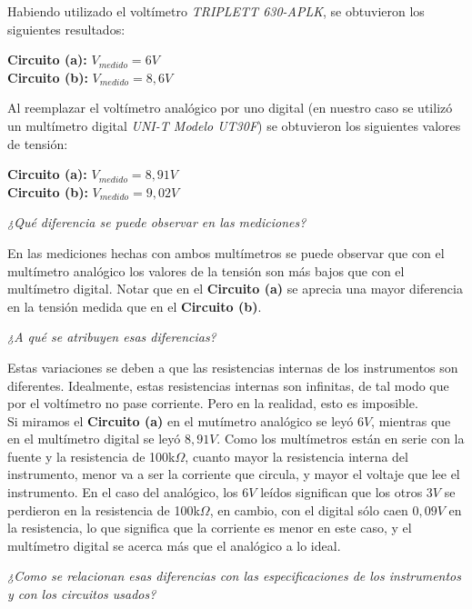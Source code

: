 \documentclass{article}
\begin{document}
\noindent Habiendo utilizado el voltímetro \textit{TRIPLETT 630-APLK}, se obtuvieron los siguientes resultados:
\bigskip

	\indent \textbf{Circuito (a):} $V_{medido} = 6V$ \smallskip\\
	\indent \textbf{Circuito (b):} $V_{medido} = 8,6V$ \\
	\medskip

	Al reemplazar el voltímetro analógico por uno digital (en nuestro caso se utilizó un multímetro digital \textit{UNI-T Modelo UT30F}) se obtuvieron los siguientes valores de tensión:
\bigskip

	\indent \textbf{Circuito (a):} $V_{medido} = 8,91V$ \smallskip\\
	\indent \textbf{Circuito (b):} $V_{medido} = 9,02V$ \\
	\bigskip



\newpage
\textit{¿Qué diferencia se puede observar en las mediciones?}
\medskip

	En las mediciones hechas con ambos multímetros se puede observar que con el multímetro analógico los valores de la tensión son más bajos que con el multímetro digital. Notar que en el \textbf{Circuito (a)} se aprecia una mayor diferencia en la tensión medida que en el 
 \textbf{Circuito (b)}.
\bigskip\bigskip


\textit{¿A qué se atribuyen esas diferencias?}
\medskip
	
	Estas variaciones se deben a que las resistencias internas de los instrumentos son diferentes. Idealmente, estas resistencias internas son infinitas, de tal modo que por el voltímetro no pase corriente. Pero en la realidad, esto es imposible.\\
\indent Si miramos el \textbf{Circuito (a)} en el mutímetro analógico se leyó $6V$, mientras que en el multímetro digital se leyó $8,91V$. Como los multímetros están en serie con la fuente y la resistencia de 100k$\Omega$, cuanto mayor la resistencia interna del instrumento, menor va a ser la corriente que circula, y mayor el voltaje que lee el instrumento. En el caso del analógico, los $6V$ leídos significan que los otros $3V$ se perdieron en la resistencia de 100k$\Omega$, en cambio, con el digital sólo caen $0,09V$ en la resistencia, lo que significa que la corriente es menor en este caso, y el multímetro digital se acerca más que el analógico a lo ideal.
\bigskip\bigskip


\textit{¿Como se relacionan esas diferencias con las especificaciones de los instrumentos y con los circuitos usados?} 
\medskip
\end{document}
